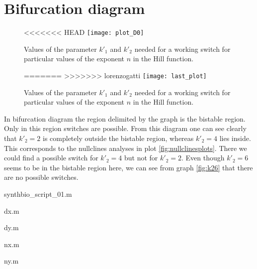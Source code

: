 \section{Bifurcation diagram}


\begin{figure}[h]
<<<<<<< HEAD
  	\centering
    \texttt{[image: plot\_D0]}
    \caption{Values of the parameter $k'_1$ and $k'_2$ needed for a working switch
 	for particular values of the exponent $n$ in the Hill function. }
=======
>>>>>>> lorenzogatti
 \centering
    \texttt{[image: last\_plot]}
    \caption{Values of the parameter $k'_1$ and $k'_2$ needed for a working
    switch
for particular values of the exponent $n$ in the Hill function.}
	\label{fig:bifurcatingplot}
\end{figure}

 
 In bifurcation diagram the region delimited by the graph is the bistable
 region. Only in this region switches are possible. From this diagram one can
 see clearly that $k'_2 = 2$ is completely outside the bistable region,
 whereas $k'_2 = 4$ lies inside. This corresponds to the nullclines analyses in
 plot \ref{fig:nullclinesplots}. There we could find a possible switch for $k'_2=4$ but not
 for $k'_2 = 2$. Even though $k'_2 = 6$ seems to be in the bistable region here,
 we can see from graph \ref{fig:k26} that there are no possible switches.

\newpage


\begin{section}{synthbio\_script\_01.m}

\end{section}
\begin{section}{dx.m}

\end{section}
\begin{section}{dy.m}

\end{section}
\begin{section}{nx.m}

\end{section}
\begin{section}{ny.m}

\end{section}
